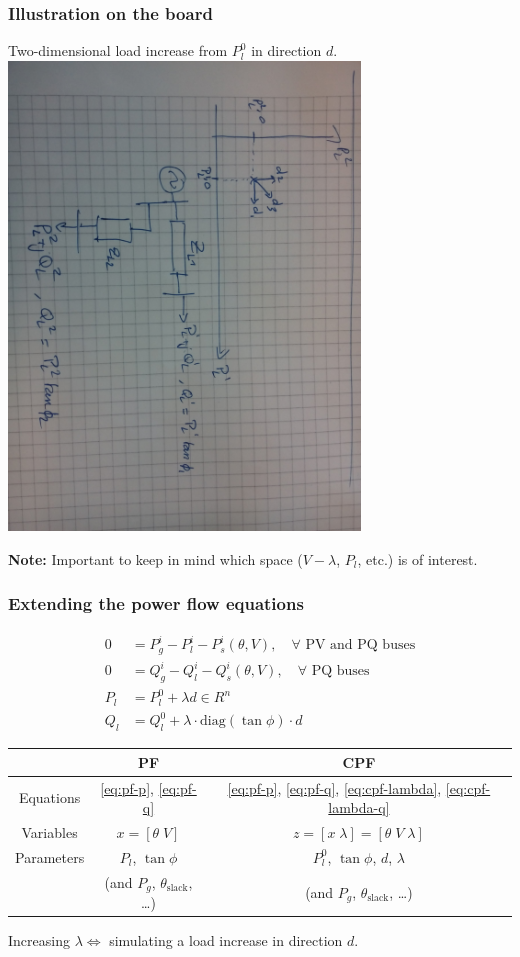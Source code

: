 \documentclass{beamer}
\begin{document}
\begin{frame}
  \frametitle{Illustration on the board}
  Two-dimensional load increase from $P_l^0$ in direction $d$.
  \includegraphics[angle=90,width=0.7\textwidth]{Figs/LoadIncrease.jpg}

\textbf{Note:} Important to keep in mind which space ($V-\lambda$, $P_l$, etc.) is of interest.
\end{frame}

\begin{frame}
  \frametitle{Extending the power flow equations}
\begin{align}
      0 &= P_g^i - P_l^i - P_s^i(\theta,V), \quad \forall \text{ PV and PQ buses} \label{eq:pf-p} \\
      0 &= Q_g^i - Q_l^i - Q_s^i(\theta,V), \quad \forall \text{ PQ buses} \label{eq:pf-q}\\
      P_l &= P_l^0 + \lambda d \in R^n \label{eq:cpf-lambda} \\
      Q_l &= Q_l^0 + \lambda \cdot \text{diag}(\tan \phi) \cdot d \label{eq:cpf-lambda-q}
    \end{align}
    \begin{center}
    \begin{tabular}{ccc}
    \toprule
      & PF & CPF \\
    \midrule
    Equations & \eqref{eq:pf-p}, \eqref{eq:pf-q} & \eqref{eq:pf-p}, \eqref{eq:pf-q}, \eqref{eq:cpf-lambda}, \eqref{eq:cpf-lambda-q}\\
    Variables & $x = [\theta \; V]$ & $z = [x \; \lambda] = [\theta \; V \; \lambda]$ \\
    Parameters & $P_l$, $\tan \phi$ & $P_l^0$, $\tan \phi$, $d$, $\lambda$ \\
     & (and $P_g$, $\theta_{\text{slack}}$, \ldots) & (and $P_g$, $\theta_{\text{slack}}$, \ldots) \\
    \bottomrule
    \end{tabular}  
    \end{center}
Increasing $\lambda \Leftrightarrow$ simulating a load increase in direction $d$.
\end{frame}
\end{document}
